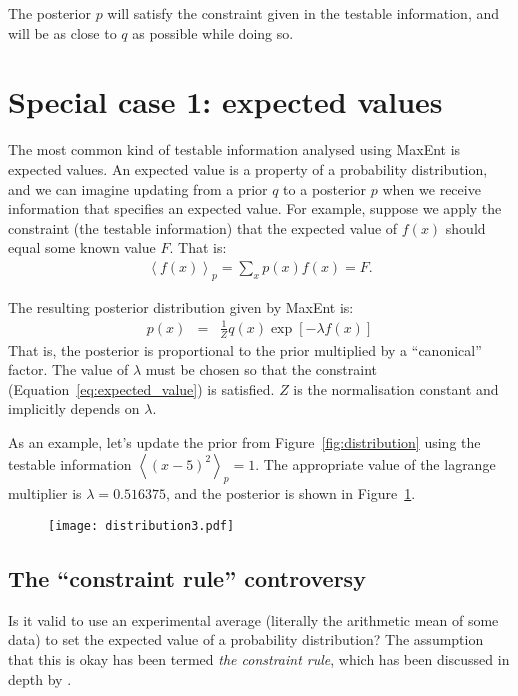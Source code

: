 \documentclass[a4paper, 11pt]{article}
\begin{document}
The posterior $p$ will satisfy the constraint given in the testable information,
and will be as close to $q$ as possible while doing so.



\section{Special case 1: expected values}\label{sec:expectations}
The most common kind of testable information analysed using MaxEnt is
expected values. An expected value is a property of a probability distribution,
and we can imagine updating from a prior $q$ to a posterior
$p$ when we receive information that specifies an expected value.
For example, suppose we apply the constraint (the testable information)
that the expected value of $f(x)$ should equal some known value $F$. That is:
\begin{eqnarray}
\left<f(x)\right>_p = \sum_x p(x)f(x) = F.\label{eq:expected_value}
\end{eqnarray}

The resulting posterior distribution given by MaxEnt is:
\begin{eqnarray}
p(x) &=& \frac{1}{Z}q(x)\exp\left[-\lambda f(x)\right] 
\end{eqnarray}
That is, the posterior is proportional to the prior multiplied by a
``canonical'' factor. The value of $\lambda$ must be chosen so that
the constraint (Equation~\ref{eq:expected_value}) is satisfied. $Z$ is the
normalisation constant and implicitly depends on $\lambda$.

As an example, let's update the prior from Figure~\ref{fig:distribution}
using the testable information $\left<(x - 5)^2\right>_p = 1$. The appropriate
value of the lagrange multiplier is $\lambda=0.516375$, and the posterior is
shown in Figure~\ref{fig:distribution3}.
\begin{figure}
\begin{center}
\texttt{[image: distribution3.pdf]}
\caption{\label{fig:distribution3}}
\end{center}
\end{figure}


\subsection{The ``constraint rule'' controversy}
Is it valid to use an experimental average (literally the arithmetic mean of
some data) to set the expected value of a probability distribution? The
assumption that this is okay has been termed {\it the constraint rule}, which
has been discussed in depth by \citet{uffink}.
\end{document}
